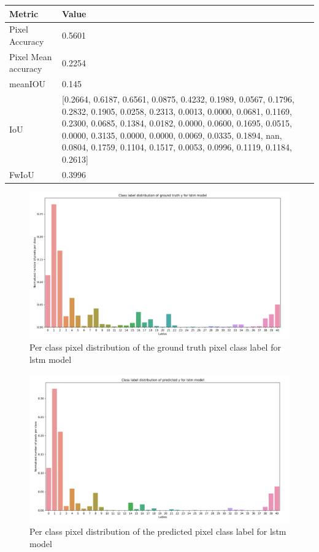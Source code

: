     \begin{center}
    	\begin{tabular}{ | l | p{12cm} |}
    		\hline
    		
    		\cellcolor{purple!30}Metric & \cellcolor{purple!30}Value \\ \hline
    		Pixel Accuracy & 0.5601 \\ \hline
    		Pixel Mean accuracy & 0.2254  \\ \hline
    		meanIOU & 0.145 \\ \hline
    		IoU & [0.2664, 0.6187, 0.6561, 0.0875, 0.4232, 0.1989, 0.0567, 0.1796, 0.2832,
    		0.1905, 0.0258, 0.2313, 0.0013, 0.0000, 0.0681, 0.1169, 0.2300, 0.0685,
    		0.1384, 0.0182, 0.0000, 0.0600, 0.1695, 0.0515, 0.0000, 0.3135, 0.0000,
    		0.0000, 0.0069, 0.0335, 0.1894,    nan, 0.0804, 0.1759, 0.1104, 0.1517,
    		0.0053, 0.0996, 0.1119, 0.1184, 0.2613] \\ \hline
    		FwIoU & 0.3996 \\ \hline
    		\hline
    	\end{tabular}
    \end{center}
	
	\begin{figure}
		\centering
		\includegraphics[width=16cm]{images/Y_ground_truth_lstm.png}
		\caption{Per class pixel distribution of the ground truth pixel class label for lstm model}
		\label{fig:y_gt_lstm}
	\end{figure}
	
	\begin{figure}
		\centering
		\includegraphics[width=16cm]{images/Y_predicted_lstm.png}
		\caption{Per class pixel distribution of the predicted pixel class label for lstm model}
		\label{fig:y_predi_lstm}
	\end{figure}
	
